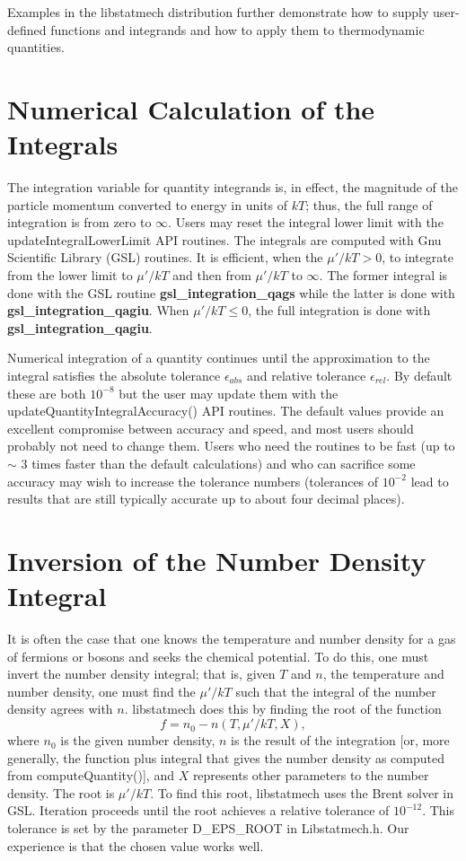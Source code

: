 \documentclass{article}    %
\begin{document}
Examples in the libstatmech distribution further demonstrate how to supply
user-defined functions and integrands and how to apply them to thermodynamic
quantities.

\section{Numerical Calculation of the Integrals}

The integration variable for quantity integrands is, in effect, the magnitude
of the particle momentum converted to energy in units of $kT$;
thus, the full range of integration is from zero to $\infty$.  Users
may reset the integral lower limit with the
updateIntegralLowerLimit API routines.  The integrals are
computed with Gnu Scientific Library (GSL) routines.  It is efficient, when the
$\mu'/kT > 0$, to integrate from the lower limit to $\mu'/kT$ and then from
$\mu'/kT$ to $\infty$.  The former integral is done with the GSL routine
{\bf gsl\_integration\_qags} while the latter is done with
{\bf gsl\_integration\_qagiu}.  When $\mu'/kT \leq 0$, the full integration is
done with {\bf gsl\_integration\_qagiu}.

Numerical integration of a quantity continues until the approximation to
the integral satisfies the absolute tolerance $\epsilon_{abs}$ and
relative tolerance $\epsilon_{rel}$.  By default these are both $10^{-8}$
but the user may update them with the
updateQuantityIntegralAccuracy() API routines.  The default
values provide an excellent compromise between accuracy and speed, and
most users should probably not need to change them.  Users who need the routines
to be fast (up to $\sim$ 3 times faster than the default calculations)
and who can sacrifice some accuracy may wish to increase the
tolerance numbers (tolerances of $10^{-2}$ lead to results that are
still typically accurate up to about four decimal places).

\section{Inversion of the Number Density Integral}

It is often the case that one knows the temperature and number density for
a gas of fermions or bosons and seeks the chemical potential.  To do this,
one must invert the number density integral; that is, given $T$ and $n$, the
temperature and number density, one must find the $\mu'/kT$ such that the
integral of the number density agrees with $n$.  libstatmech does this by
finding the root of the function
\begin{equation}
f = n_0 - n(T,\mu'/kT, X),
\end{equation}
where $n_0$ is the given number density, $n$ is the result of the integration
[or, more generally, the function plus integral that gives the number density
as computed from computeQuantity()],
and $X$ represents other parameters to the number density.  The root is
$\mu'/kT$.  To find this root, libstatmech uses the Brent solver in
GSL.  Iteration proceeds until the root achieves a relative tolerance
of $10^{-12}$.  This tolerance is set by the parameter D\_EPS\_ROOT in
Libstatmech.h.  Our experience is that the chosen value works well.
\end{document}
